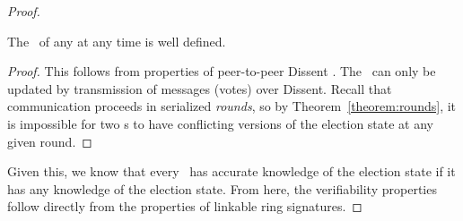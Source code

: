 \begin{proof}

  \begin{lemma}The \StructElectionState~of any \StructElection at
  any time is well defined. \end{lemma}
  \begin{proof}This follows from properties of peer-to-peer Dissent \cite{sec}.
    The \StructElectionState~can only be updated by transmission of messages
    (votes) over Dissent. Recall that communication proceeds in serialized
    \emph{rounds}, so by Theorem~\ref{theorem:rounds}, it is impossible for two
    \KwPeer s to have conflicting versions of the election state at any
    given round.
  \end{proof}

  Given this, we know that every \KwPeer~has accurate knowledge of the
  election state if it has any knowledge of the election state. From here, the
  verifiability properties follow directly from the properties of linkable ring
  signatures.


\end{proof}
